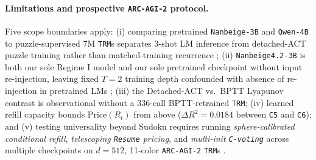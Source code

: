 \documentclass[10pt,letterpaper]{article}
\begin{document}
\paragraph{Limitations and prospective \texttt{ARC-AGI-2} protocol.} Five scope boundaries apply: (i) comparing pretrained \texttt{Nanbeige-3B} and \texttt{Qwen-4B} to puzzle-supervised 7M \texttt{TRM}s separates 3-shot LM inference from detached-ACT puzzle training rather than matched-training recurrence \cite{sesodia2026inside}; (ii) \texttt{Nanbeige4.2-3B} is both our sole Regime I model and our sole pretrained checkpoint without input re-injection, leaving fixed $T=2$ training depth confounded with absence of re-injection in pretrained LMs \cite{olszowiec2026monitoring}; (iii) the Detached-ACT vs.\ BPTT Lyapunov contrast is observational without a 336-call BPTT-retrained \texttt{TRM}; (iv) learned refill capacity bounds $\mathrm{Price}(R_t)$ from above ($\Delta R^2 = 0.0184$ between \texttt{C5} and \texttt{C6}); and (v) testing universality beyond Sudoku requires running \emph{sphere-calibrated conditional refill}, \emph{telescoping \texttt{Resume} pricing}, and \emph{multi-init \texttt{C-voting}} across multiple checkpoints on $d=512$, 11-color \texttt{ARC-AGI-2} \texttt{TRM}s \cite{jolicoeur2025trm}.



\end{document}
